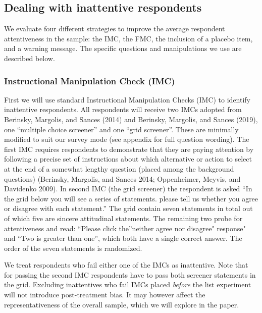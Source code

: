 \documentclass[]{article}
\begin{document}
\hypertarget{dealing-with-inattentive-respondents}{%
\subsection{Dealing with inattentive
respondents}\label{dealing-with-inattentive-respondents}}

We evaluate four different strategies to improve the average respondent
attentiveness in the sample: the IMC, the FMC, the inclusion of a
placebo item, and a warning message. The specific questions and
manipulations we use are described below.

\hypertarget{instructional-manipulation-check-imc}{%
\subsubsection{Instructional Manipulation Check
(IMC)}\label{instructional-manipulation-check-imc}}

First we will use standard Instructional Manipulation Checks (IMC) to
identify inattentive respondents. All respondents will receive two IMCs
adopted from Berinsky, Margolis, and Sances (2014) and Berinsky,
Margolis, and Sances (2019), one ``multiple choice screener'' and one
``grid screener''. These are minimally modified to suit our survey mode
(see appendix for full question wording). The first IMC requires
respondents to demonstrate that they are paying attention by following a
precise set of instructions about which alternative or action to select
at the end of a somewhat lengthy question (placed among the background
questions) (Berinsky, Margolis, and Sances 2014; Oppenheimer, Meyvis,
and Davidenko 2009). In second IMC (the grid screener) the respondent is
asked ``In the grid below you will see a series of statements. please
tell us whether you agree or disagree with each statement.'' The grid
contain seven statements in total out of which five are sincere
attitudinal statements. The remaining two probe for attentiveness and
read: ``Please click the''neither agree nor disagree" response" and
``Two is greater than one'', which both have a single correct answer.
The order of the seven statements is randomized.

We treat respondents who fail either one of the IMCs as inattentive.
Note that for passing the second IMC respondents have to pass both
screener statements in the grid. Excluding inattentives who fail IMCs
placed \emph{before} the list experiment will not introduce
post-treatment bias. It may however affect the representativeness of the
overall sample, which we will explore in the paper.
\end{document}
